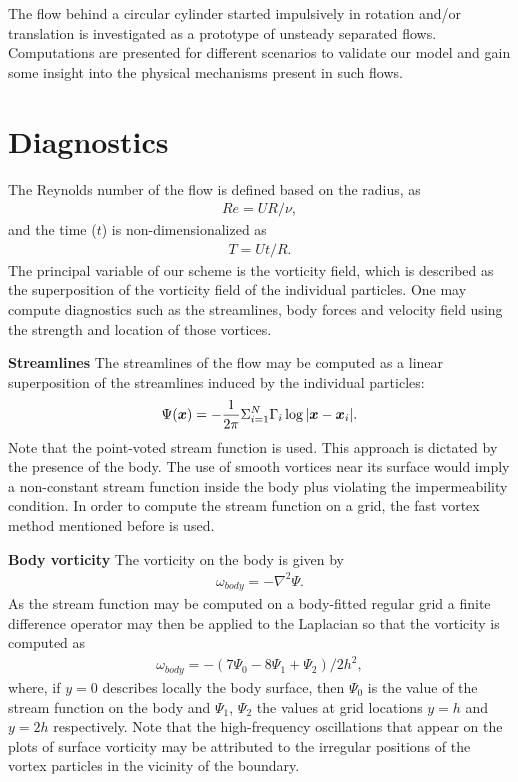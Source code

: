 


The flow behind a circular cylinder started impulsively in rotation and/or translation is investigated as a prototype of unsteady separated flows.
Computations are presented for different scenarios to validate our model and gain some insight into the physical mechanisms present in such flows.

\section{Diagnostics}

The Reynolds number of the flow is defined based on the radius, as
\begin{align}
Re = UR/\nu,
\end{align}
and the time ($t$) is non-dimensionalized as
\begin{align}
T = Ut/R.
\end{align}
The principal variable of our scheme is the vorticity field, which is described as the superposition of the vorticity field of the individual particles.
One may compute diagnostics such as the streamlines, body forces and velocity field using the strength and location of those vortices.

{\bf Streamlines}
The streamlines of the flow may be computed as a linear superposition of the streamlines induced by the individual particles:
\begin{align}
\Psi (\boldsymbol{x}) = -\frac{1}{2\pi} \Sigma_{i=1}^{N} \Gamma_i \log |\boldsymbol{x} - \boldsymbol{x}_i|.
\end{align}
Note that the point-voted stream function is used. This approach is dictated by the presence of the body.
The use of smooth vortices near its surface would imply a non-constant stream function inside the body plus violating the impermeability condition.
In order to compute the stream function on a grid, the fast vortex method mentioned before is used.

{\bf Body vorticity}
The vorticity on the body is given by
\begin{align}
\omega_{body} = -\nabla^2 \Psi.
\end{align}
As the stream function may be computed on a body-fitted regular grid a finite difference operator may then be applied to the Laplacian so that the vorticity is computed as
\begin{align}
\omega_{body} = - (7\Psi_0 - 8\Psi_1 + \Psi_2) / 2h^2,
\end{align}
where, if $y = 0$ describes locally the body surface, then $\Psi_0$ is the value of the stream function on the body and $\Psi_1$, $\Psi_2$ the values at grid locations $y = h$ and $y = 2h$ respectively.
Note that the high-frequency oscillations that appear on the plots of surface vorticity may be attributed to the irregular positions of the vortex particles in the vicinity of the boundary.

